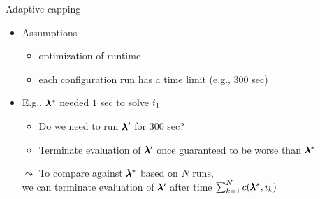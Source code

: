 \begin{frame}[c,fragile]{Adaptive capping }

\begin{itemize}
	\item Assumptions
	\begin{itemize} 
		\item optimization of runtime
		\item each configuration run has a time limit (e.g., $300$ sec)
	\end{itemize}
	\pause    
	
	\item E.g., $\pmb{\lambda}^*$ needed $1$ sec to solve $i_1$
	\begin{itemize}
		\item Do we need to run $\pmb{\lambda}'$ for $300$ sec?
		\item Terminate evaluation of $\pmb{\lambda}'$ once guaranteed to be worse than $\pmb{\lambda}^*$
	\end{itemize}
	\pause
	\bigskip    
	\item[$\leadsto$] To compare against $\pmb{\lambda}^*$ based on $N$ runs,\\ we can terminate evaluation of $\pmb{\lambda}'$ after time $\sum_{k=1}^N c(\pmb{\lambda}^*,i_k)$
\end{itemize}

\end{frame}
